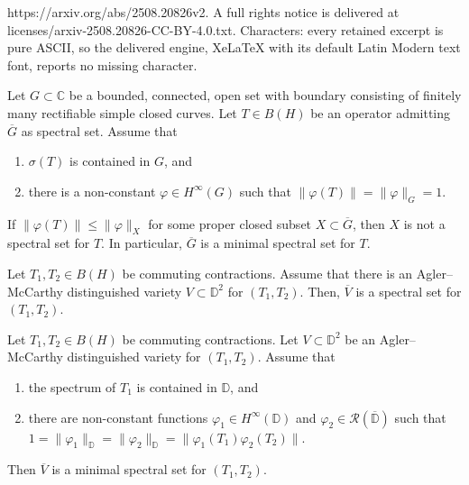 \documentclass[10pt,a4paper]{amsart}
\newcommand{\R}{{\mathcal{R}}}
\newcommand{\bC}{{\mathbb{C}}}
\newcommand{\bD}{{\mathbb{D}}}
\newcommand{\ol}{\overline}
\renewcommand{\phi}{\varphi}
\begin{document}
https://arxiv.org/abs/2508.20826v2. A full rights notice is delivered at licenses/arxiv-2508.20826-CC-BY-4.0.txt. Characters: every retained excerpt is pure ASCII, so the delivered engine, XeLaTeX with its default Latin Modern text font, reports no missing character.
\begin{theorem}\label{T:Williams} Let $G\subset \bC$ be a bounded, connected, open set with boundary consisting of finitely many rectifiable simple closed curves. Let $T\in B(H)$ be an operator admitting $\ol{G}$ as spectral set.
Assume that
\begin{enumerate}[{\rm (i)}]
\item $\sigma(T)$ is contained in $G$, and
\item there is a non-constant $\phi\in H^\infty(G)$ such that $\|\phi(T)\|=\|\phi\|_G=1$.
\end{enumerate}
If $\|\phi(T)\|\leq \|\phi\|_X$ for some proper closed subset $X\subset \ol{G}$, then $X$ is not a spectral set for $T$. In particular, $\ol{G}$ is a minimal spectral set for $T$.
\end{theorem}

\begin{theorem}\label{T:AMratspectral}
Let $T_1,T_2\in B(H)$ be commuting contractions. Assume that there is an Agler--McCarthy distinguished variety $V\subset \bD^2$ for $(T_1,T_2)$. Then, $\ol{V}$ is a spectral set for $(T_1,T_2)$.
\end{theorem}

\begin{theorem}\label{T:min2var}
Let $T_1,T_2\in B(H)$ be commuting contractions. Let $V\subset \bD^2$ be an Agler--McCarthy distinguished variety for $(T_1,T_2)$. 
Assume that
\begin{enumerate}[{\rm (i)}]
\item the spectrum of $T_1$ is contained in $\bD$, and
\item there are non-constant functions $\phi_1\in H^\infty(\bD)$ and $\phi_2\in \R(\ol{\bD})$ such that $1=\|\phi_1\|_{\bD}=\|\phi_2\|_{\bD}=\|\phi_1(T_1)\phi_2(T_2)\|$.
\end{enumerate}
Then $\ol{V}$ is a minimal spectral set for $(T_1,T_2)$.
\end{theorem}
\end{document}
